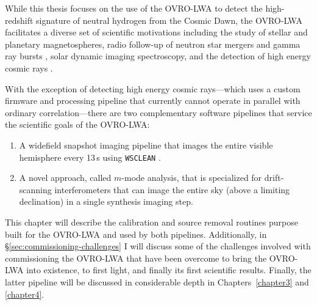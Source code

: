 \begin{bibunit}
While this thesis focuses on the use of the OVRO-LWA to detect the high-redshift signature of
neutral hydrogen from the Cosmic Dawn, the OVRO-LWA facilitates a diverse set of scientific
motivations including the study of stellar and planetary magnetospheres, radio follow-up of neutron
star mergers and gamma ray bursts \citep{2017arXiv171106665A}, solar dynamic imaging spectroscopy,
and the detection of high energy cosmic rays \citep{caltechthesis11016}.

With the exception of detecting high energy cosmic rays---which uses a custom firmware and
processing pipeline that currently cannot operate in parallel with ordinary correlation---there are
two complementary software pipelines that service the scientific goals of the OVRO-LWA:
\begin{enumerate}
    \item A widefield snapshot imaging pipeline that images the entire visible hemisphere every
        13\,s using \texttt{WSCLEAN} \citep{2014MNRAS.444..606O}.
    \item A novel approach, called $m$-mode analysis, that is specialized for drift-scanning
        interferometers that can image the entire sky (above a limiting declination) in a single
        synthesis imaging step.
\end{enumerate}
This chapter will describe the calibration and source removal routines purpose built for the
OVRO-LWA and used by both pipelines. Additionally, in \S\ref{sec:commissioning-challenges} I will
discuss some of the challenges involved with commissioning the OVRO-LWA that have been overcome to
bring the OVRO-LWA into existence, to first light, and finally its first scientific results.
Finally, the latter pipeline will be discussed in considerable depth in Chapters~\ref{chapter3} and
\ref{chapter4}.


\end{bibunit}
